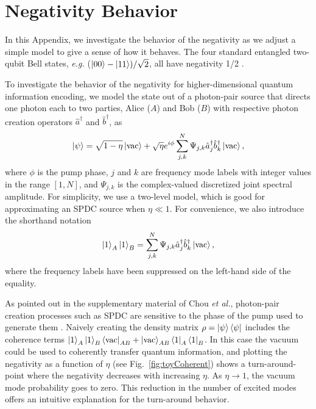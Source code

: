 \documentclass[twocolumn,amssymb, nobibnotes, showpacs, aps, pra,10pt]{revtex4-1}
\begin{document}
\section{Negativity Behavior} \label{app:negativity}
In this Appendix, we investigate the behavior of the negativity as we adjust a simple model to give a sense of how it behaves. The four standard entangled two-qubit Bell states, \emph{e.g.} ($\ket{00} - \ket{11})/\sqrt{2}$, all have negativity 1/2 \cite{Rangamani2014}.

To investigate the behavior of the negativity for higher-dimensional quantum information encoding, we model the state out of a photon-pair source that directs one photon each to two parties, Alice ($A$) and Bob ($B$) with respective photon creation operators $\hat{a}^\dagger$ and $\hat{b}^\dagger$, as
\begin{equation}\label{eq:toyState}
\ket{\psi} = \sqrt{1-\eta} \ket{\text{vac}} + \sqrt{\eta} e^{i \phi} \sum^N_{j,k} \Psi_{j,k} \hat{a}^\dagger_{j} \hat{b}^\dagger_{k}    \ket{\text{vac}},
\end{equation}
where $\phi$ is the pump phase, $j$ and $k$ are frequency mode labels with integer values in the range $[1,N]$, and $\Psi_{j,k}$ is the complex-valued discretized joint spectral amplitude. For simplicity, we use a two-level model, which is good for approximating an SPDC source when $\eta \ll 1$. For convenience, we also introduce the shorthand notation
\begin{equation}
\ket{1}_A \ket{1}_B = \sum^N_{j,k} \Psi_{j,k} \hat{a}^\dagger_{j} \hat{b}^\dagger_{k} \ket{\text{vac}},
\end{equation}
where the frequency labels have been suppressed on the left-hand side of the equality.

As pointed out in the supplementary material of Chou \emph{et al.}, photon-pair creation processes such as SPDC are sensitive to the phase of the pump used to generate them \cite{Chou2005}. Naively creating the density matrix $\rho = \ket{\psi} \bra{\psi}$ includes the coherence terms $\ket{1}_A \ket{1}_B \bra{\text{vac}}_{AB} + \ket{\text{vac}}_{AB} \bra{1}_A \bra{1}_B$. In this case the vacuum could be used to coherently transfer quantum information, and plotting the negativity as a function of $\eta$ (see Fig.\ \ref{fig:toyCoherent}) shows a turn-around-point where the negativity decreases with increasing $\eta$. As $\eta \to 1$, the vacuum mode probability goes to zero. This reduction in the number of excited modes offers an intuitive explanation for the turn-around behavior.
\end{document}
